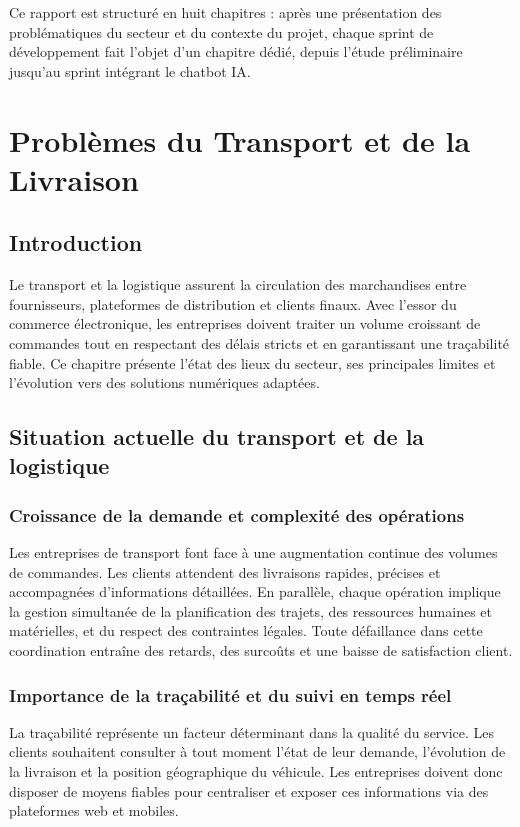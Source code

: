 \documentclass[12pt,a4paper,oneside]{report}
\begin{document}
Ce rapport est structuré en huit chapitres : après une présentation des problématiques du secteur et du contexte du projet, chaque sprint de développement fait l'objet d'un chapitre dédié, depuis l'étude préliminaire jusqu'au sprint intégrant le chatbot IA.

\chapter{Problèmes du Transport et de la Livraison}

\section{Introduction}
Le transport et la logistique assurent la circulation des marchandises entre fournisseurs, plateformes de distribution et clients finaux. Avec l'essor du commerce électronique, les entreprises doivent traiter un volume croissant de commandes tout en respectant des délais stricts et en garantissant une traçabilité fiable. Ce chapitre présente l'état des lieux du secteur, ses principales limites et l'évolution vers des solutions numériques adaptées.

\section{Situation actuelle du transport et de la logistique}

\subsection{Croissance de la demande et complexité des opérations}
Les entreprises de transport font face à une augmentation continue des volumes de commandes. Les clients attendent des livraisons rapides, précises et accompagnées d'informations détaillées. En parallèle, chaque opération implique la gestion simultanée de la planification des trajets, des ressources humaines et matérielles, et du respect des contraintes légales. Toute défaillance dans cette coordination entraîne des retards, des surcoûts et une baisse de satisfaction client.

\subsection{Importance de la traçabilité et du suivi en temps réel}
La traçabilité représente un facteur déterminant dans la qualité du service. Les clients souhaitent consulter à tout moment l'état de leur demande, l'évolution de la livraison et la position géographique du véhicule. Les entreprises doivent donc disposer de moyens fiables pour centraliser et exposer ces informations via des plateformes web et mobiles.
\end{document}
